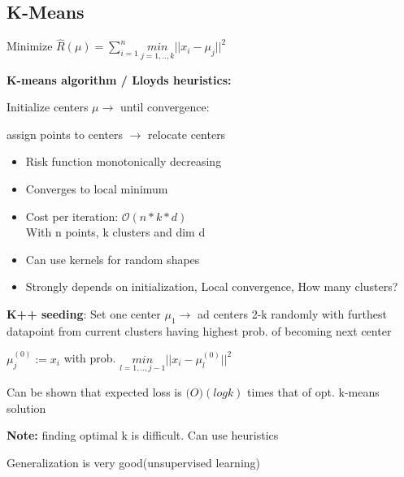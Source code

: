 \subsection{K-Means}

\begin{center}
   Minimize $\hat{R}(\mu) = \sum_{i=1}^n \underset{j=1,..,k}{min}||x_i - \mu_j||^2$
\end{center}
\textbf{K-means algorithm / Lloyds heuristics: }

Initialize centers $\mu \rightarrow$ until convergence: 

assign points to centers $\rightarrow$ relocate centers
\begin{itemize}
    \item Risk function monotonically decreasing
    \item Converges to local minimum
    \item Cost per iteration: $\mathcal{O}(n*k*d)$\\
    With n points, k clusters and dim d
    \item Can use kernels for random shapes
    \item \color{Red}Strongly depends on initialization, Local convergence, How many clusters?\color{black}
\end{itemize}
\textbf{K++ seeding}: Set one center $\mu_1 \rightarrow$ ad centers 2-k randomly with furthest datapoint from current clusters having highest prob. of becoming next center

\begin{center}
    $\mu_j^{(0)} := x_i$ with prob. $\underset{l=1,..,j-1}{min}||x_i - \mu_l^{(0)}||^2$
\end{center}

Can be shown that expected loss is $\mathcal(O)(logk)$ times that of opt. k-means solution

\textbf{Note:} finding optimal k is difficult. Can use heuristics

Generalization is very good(unsupervised learning)